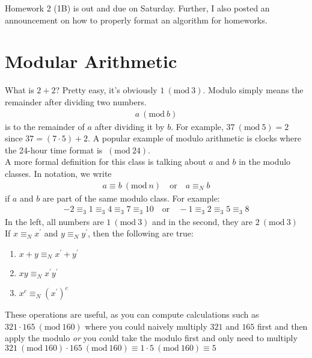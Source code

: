 \documentclass[14pt]{extarticle}
\newcommand{\Mod}[1]{\ (\mathrm{mod}\ #1)}
\begin{document}
	\MakeScribeTop

    Homework 2 (1B) is out and due on Saturday. Further, I also posted an
    announcement on how to properly format an algorithm for homeworks.

    \section*{Modular Arithmetic}
    What is $2 + 2$? Pretty easy, it's obviously $1 \Mod{3}$. Modulo
    simply means the remainder after dividing two numbers. 
    \begin{align*}
        a\Mod{b}
    \end{align*}
    is  to the remainder of $a$ after dividing it by $b$. For
    example, $37\Mod{5} = 2$ since $37 = (7\cdot 5) + 2$. A popular
    example of modulo arithmetic is clocks where the 24-hour time format
    is $\Mod{24}$.\\

    A more formal definition for this class is talking about $a$ and $b$
    in the modulo classes. In notation, we write
    \begin{align*}
        a\equiv b\Mod{n}\quad\text{or}\quad a\equiv_N b
    \end{align*}
    if $a$ and $b$ are part of the same modulo class. For example:
    \begin{align*}
        -2\equiv_3 1\equiv_3 4\equiv_3 7\equiv_3 10
        \quad
        \text{or}
        \quad
        -1\equiv_3 2\equiv_3 5\equiv_3 8
    \end{align*}
    In the left, all numbers are $1\Mod{3}$ and in the second, they are
    $2\Mod{3}$\\

    If $x\equiv_N x^\prime$ and $y\equiv_N y^\prime$, then the following
    are true:
    \begin{enumerate}
        \item $x + y\equiv_N x^\prime + y^\prime$
        \item $xy \equiv_N x^\prime y^\prime$
        \item $x^c \equiv_N (x^\prime)^c$
    \end{enumerate}

    \pagebreak 

    These operations are useful, as you can compute calculations such as
    $321\cdot 165 \Mod{160}$ where you could naively multiply $321$ and $165$
    first and then apply the modulo \textit{or} you could take the modulo
    first and only need to multiply $321\Mod{160} \cdot 165\Mod{160} \equiv
    1\cdot 5 \Mod{160} \equiv 5$\\
\end{document}
